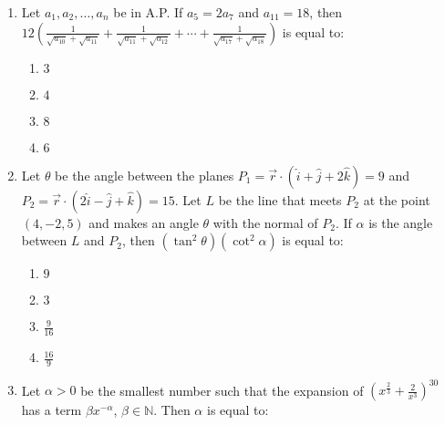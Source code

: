 \documentclass[journal]{IEEEtran}
\newcommand{\brak}[1]{\left( #1 \right)}
\newcommand{\gt}{>}
\begin{document}
\begin{enumerate}
        \begin{multicols}{4}
        \begin{enumerate}
        \item $2997$
        \item $2998$
        \item $2999$
        \item $2996$
        \end{enumerate}
        \end{multicols}

    \item Let $a_{1}, a_{2},\ldots,a_{n}$ be in A.P. If $a_{5}=2a_{7}$ and $a_{11}=18$, then
    $
    12\left(\frac{1}{\sqrt{a_{10}}+\sqrt{a_{11}}}+\frac{1}{\sqrt{a_{11}}+\sqrt{a_{12}}}+\cdots+\frac{1}{\sqrt{a_{17}}+\sqrt{a_{18}}}\right)
    $
    is equal to:
    
        \begin{multicols}{4}
        \begin{enumerate}
        \item $3$
        \item $4$
        \item $8$
        \item $6$
        \end{enumerate}
        \end{multicols}
   
    \item Let $\theta$ be the angle between the planes $P_{1}=\vec{r}\cdot\brak{\hat{i}+\hat{j}+2\hat{k}}=9$ and $P_{2}=\vec{r}\cdot\brak{2\hat{i}-\hat{j}+\hat{k}}=15$. Let $L$ be the line that meets $P_{2}$ at the point $\brak{4,-2, 5}$ and makes an angle $\theta$ with the normal of $P_{2}$. If $\alpha$ is the angle between $L$ and $P_{2}$, then $\brak{\tan^{2}\theta}\brak{\cot^{2}\alpha}$ is equal to:

        \begin{multicols}{4}
        \begin{enumerate}
        \item $9$
        \item $3$
        \item $\frac{9}{16}$
        \item $\frac{16}{9}$
        \end{enumerate}
        \end{multicols}

    \item Let $\alpha \gt 0$ be the smallest number such that the expansion of $\brak{x^{\frac{2}{3}}+\frac{2}{x^{3}}}^{30}$ has a term $\beta x^{-\alpha}$, $\beta\in\mathbb{N}$. Then $\alpha$ is equal to:


\end{enumerate}
\end{document}
